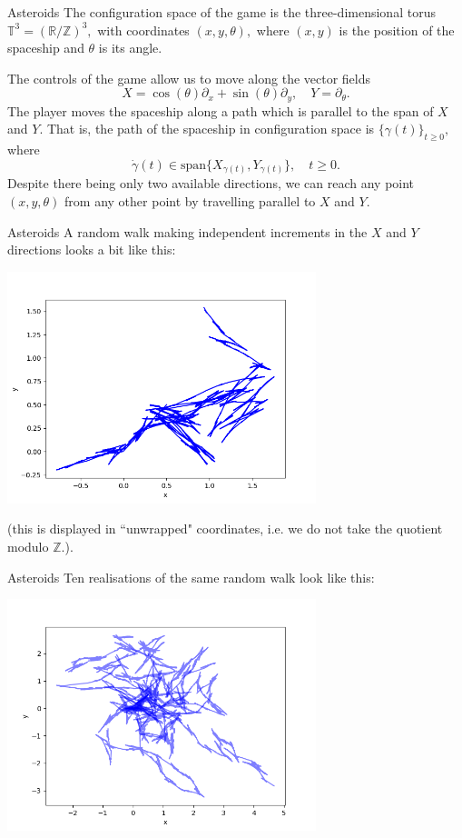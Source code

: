 \documentclass{beamer}
\numberwithin{equation}{section}
\theoremstyle{plain}
\theoremstyle{plain}
\theoremstyle{definition}
\theoremstyle{plain}
\theoremstyle{plain}
\theoremstyle{definition}
\newcommand{\Rl}{\mathbb{R}}
\newcommand{\Itgr}{\mathbb{Z}}
\newcommand{\Circ}{\mathbb{T}}
\begin{document}
\begin{frame}{Asteroids}
  The configuration space of the game is the three-dimensional torus $\Circ^3 = (\Rl/\Itgr)^3,$ with coordinates $(x,y,\theta),$ where $(x,y)$ is the position of the spaceship and $\theta$ is its angle.

  The controls of the game allow us to move along the vector fields
  \[
    X = \cos(\theta)\partial_x+\sin(\theta)\partial_y,\quad Y = \partial_\theta.
  \]
  \pause
  The player moves the spaceship along a path which is parallel to the span of $X$ and $Y.$ That is, the path of the spaceship in configuration space is $\{\gamma(t)\}_{t\geq 0},$ where
  \[
    \dot{\gamma}(t) \in \mathrm{span}\{X_{\gamma(t)},Y_{\gamma(t)}\},\quad t\geq 0.
  \]
  \pause
  Despite there being only two available directions, we can reach any point $(x,y,\theta)$ from any other point by travelling parallel to $X$ and $Y.$
\end{frame}


\begin{frame}{Asteroids}
  A random walk making independent increments in the $X$ and $Y$ directions looks a bit like this:
  \begin{center}
  \includegraphics[width=90mm]{xy_coords_single_paths.png}
  \end{center}
  (this is displayed in ``unwrapped" coordinates, i.e. we do not take the quotient modulo $\Itgr.$).
\end{frame}

\begin{frame}{Asteroids}
  Ten realisations of the same random walk look like this:
  \begin{center}
    \includegraphics[width=90mm]{xy_coords_multiple_paths.png}
  \end{center}
\end{frame}
\end{document}
